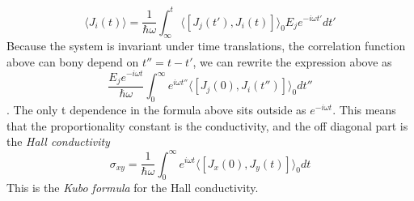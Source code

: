\begin{equation}
    \langle J_i(t)\rangle=\frac 1{\hbar\omega}\int_{\infty}^t
    \langle[J_j(t'),J_i(t)]\rangle_0 E_je^{-i\omega t'}dt'
\end{equation}
Because the system is invariant under time translations, the correlation function above can bony depend on $t''=t-t'$, we can rewrite the expression above as
\begin{equation}
    \frac{E_je^{-i\omega t}}{\hbar \omega}\int_0^{\infty}e^{i\omega t''} \langle[J_j(0),J_i(t'')]\rangle_0 dt''
\end{equation}.
The only t dependence in the formula above sits outside as $e^{-i\omega t}$. This means that the proportionality constant is the conductivity, and the off diagonal part is the \textit{Hall conductivity}
\begin{equation}
    \sigma_{xy}=\frac 1{\hbar \omega}\int_0^{\infty}e^{i\omega t} \langle[J_x(0),J_y(t)]\rangle_0 dt
    \label{eq:kubo}
\end{equation}
This is the \textit{Kubo formula} for the Hall conductivity.








